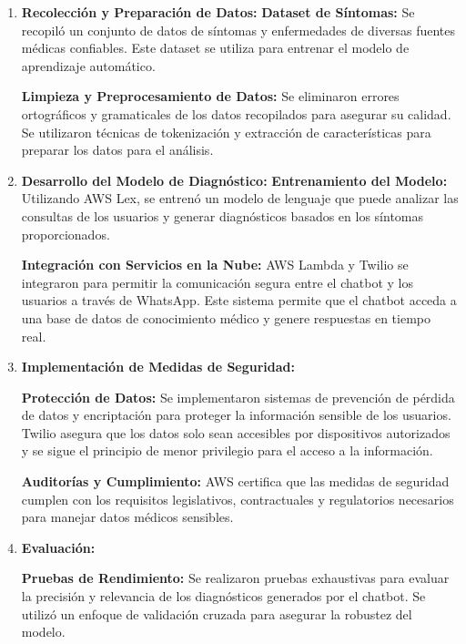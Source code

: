 \begin{enumerate}
	
	\item \textbf{Recolección y Preparación de Datos:}
		\subitem \textbf{Dataset de Síntomas:} Se recopiló un conjunto de datos de síntomas y enfermedades de diversas fuentes médicas confiables. Este dataset se utiliza para entrenar el modelo de aprendizaje automático.
	
		\subitem \textbf{Limpieza y Preprocesamiento de Datos:} Se eliminaron errores ortográficos y gramaticales de los datos recopilados para asegurar su calidad. Se utilizaron técnicas de tokenización y extracción de características para preparar los datos para el análisis.
	
	\item \textbf{Desarrollo del Modelo de Diagnóstico:}
		\subitem \textbf{Entrenamiento del Modelo:} Utilizando AWS Lex, se entrenó un modelo de lenguaje que puede analizar las consultas de los usuarios y generar diagnósticos basados en los síntomas proporcionados.
		
		\subitem \textbf{Integración con Servicios en la Nube:} AWS Lambda y Twilio se integraron para permitir la comunicación segura entre el chatbot y los usuarios a través de WhatsApp. Este sistema permite que el chatbot acceda a una base de datos de conocimiento médico y genere respuestas en tiempo real.
	
	\item \textbf{Implementación de Medidas de Seguridad:}
	
		\subitem \textbf{Protección de Datos:} Se implementaron sistemas de prevención de pérdida de datos y encriptación para proteger la información sensible de los usuarios. Twilio asegura que los datos solo sean accesibles por dispositivos autorizados y se sigue el principio de menor privilegio para el acceso a la información.
		
		\subitem \textbf{Auditorías y Cumplimiento:} AWS certifica que las medidas de seguridad cumplen con los requisitos legislativos, contractuales y regulatorios necesarios para manejar datos médicos sensibles.
	
	\item \textbf{Evaluación:}
		
		\subitem \textbf{Pruebas de Rendimiento:} Se realizaron pruebas exhaustivas para evaluar la precisión y relevancia de los diagnósticos generados por el chatbot. Se utilizó un enfoque de validación cruzada para asegurar la robustez del modelo.
		
\end{enumerate}

